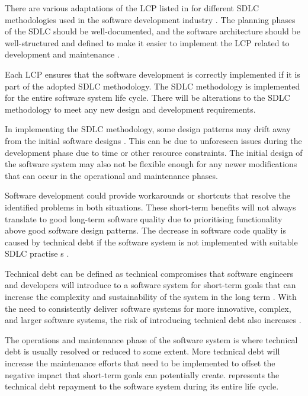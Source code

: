 There are various adaptations of the LCP listed in  for different SDLC methodologies used in the software development industry \cite{Al-Saiyd2015}. The planning phases of the SDLC should be well-documented, and the software architecture should be well-structured and defined to make it easier to implement the LCP related to development and maintenance \cite{Ackermann2009}.\par Each LCP ensures that the software development is correctly implemented if it is part of the adopted SDLC methodology. The SDLC methodology is implemented for the entire software system life cycle. There will be alterations to the SDLC methodology to meet any new design and development requirements. \par In implementing the SDLC methodology, some design patterns may drift away from the initial software designs \cite{Reimanis2016}. This can be due to unforeseen issues during the development phase due to time or other resource constraints. The initial design of the software system may also not be flexible enough for any newer modifications that can occur in the operational and maintenance phases. \par Software development could provide workarounds or shortcuts that resolve the identified problems in both situations. These short-term benefits will not always translate to good long-term software quality due to prioritising functionality above good software design patterns. The decrease in software code quality is caused by technical debt if the software system is not implemented with suitable SDLC practise s \cite{DeLeon-Sigg2020, Reimanis2016}. \par Technical debt can be defined as technical compromises that software engineers and developers will introduce to a software system for short-term goals that can increase the complexity and sustainability of the system in the long term \cite{Snipes2018, Gralha2018}. With the need to consistently deliver software systems for more innovative, complex, and larger software systems, the risk of introducing technical debt also increases \cite{Reimanis2016, Khan2013}. \par The operations and maintenance phase of the software system is where technical debt is usually resolved or reduced to some extent. More technical debt will increase the maintenance efforts that need to be implemented to offset the negative impact that short-term goals can potentially create.  represents the technical debt repayment to the software system during its entire life cycle.

